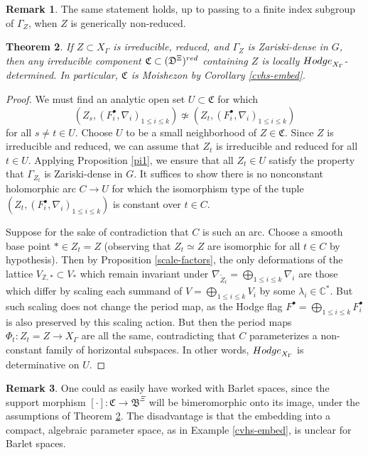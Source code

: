 \documentclass[10pt,letterpaper,english,reqno]{amsart}
\numberwithin{equation}{subsection}
\newcommand\fB{{\mathfrak B}}
\newcommand\fC{{\mathfrak C}}
\newcommand\fD{{\mathfrak D}}
\newcommand\C{{\mathbb C}}
\newcommand\Z{{\mathbb Z}}
\newcommand\wZ{{\widetilde Z}}
\newtheorem{theorem}{Theorem}[section]
\theoremstyle{definition}
\newtheorem{remark}[theorem]{Remark}
\begin{document}
\begin{remark} The same statement holds, up to passing to
a finite index subgroup of $\Gamma_Z$, 
when $Z$ is generically non-reduced.
\end{remark}

\begin{theorem}\label{rigid-thm}
If $Z\subset X_\Gamma$ is irreducible, reduced,
and $\Gamma_Z$ is Zariski-dense in $G$, then any
irreducible component $\fC\subset (\fD^{\Xi})^{\rm red}$ containing
$Z$ is locally ${\rm Hodge}_{X_\Gamma}$-determined. In particular, $\fC$ is Moishezon by Corollary \ref{cvhs-embed}.\end{theorem}

\begin{proof} We must find an analytic open
set $U\subset \fC$ for which $$(Z_s, (F^\bullet_i,\nabla_i)_{1\leq i \leq k})\not\simeq (Z_t, (F_i^\bullet,\nabla_i)_{1\leq i\leq k})$$
for all $s\neq t\in U$. 
Choose $U$ to be a small neighborhood of $Z\in \fC$.
Since $Z$ is irreducible and reduced, 
we can assume that $Z_t$ is irreducible and reduced
for all $t\in U$. Applying Proposition \ref{pi1},
we ensure that all $Z_t\in U$ satisfy the property
that $\Gamma_{Z_t}$ is Zariski-dense in $G$.
It suffices to show there is no nonconstant
holomorphic
arc $C\to U$ for which the isomorphism type
of the tuple
$(Z_t,(F^\bullet_i,\nabla_i)_{1\leq i \leq k})$ 
is constant over $t\in C$.

Suppose for the sake
of contradiction that $C$ is such an arc. 
Choose a smooth base point $*\in Z_t=Z$ (observing
that $Z_t\simeq Z$ are isomorphic for all $t\in C$
by hypothesis).
Then by Proposition
\ref{scale-factors}, the only deformations of the lattice $V_{\Z,*}\subset V_*$ which remain invariant under $\nabla_{\wZ_t}=\bigoplus_{1\leq i\leq k} \nabla_i$ are those which differ by scaling each 
summand of $V=\bigoplus_{1\leq i\leq k} V_i$ by some $\lambda_i\in \C^*$.
But such scaling does not change
the period map, as the Hodge flag
$F^\bullet =\bigoplus_{1\leq i\leq k} F_i^\bullet$ is also
preserved by this scaling action.
But then the period maps
$\Phi_t\colon Z_t=Z\to X_\Gamma $ are all
the same, contradicting that $C$ parameterizes
a non-constant family of horizontal subspaces.
In other words, 
${\rm Hodge}_{X_\Gamma}$ is determinative on 
$U$.
\end{proof}

\begin{remark}\label{db} One could as easily have worked 
with Barlet spaces, since
the support morphism $[\cdot]\colon \fC\to \fB^{\Xi}$ will be
bimeromorphic onto its image, under the assumptions
of Theorem \ref{rigid-thm}. The disadvantage is that
the embedding into a compact, algebraic parameter space, as in
Example \ref{cvhs-embed}, is unclear for 
Barlet spaces. \end{remark}
\end{document}
